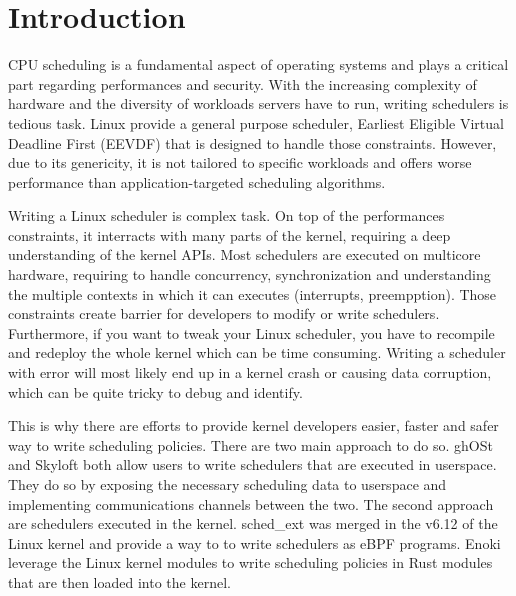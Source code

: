\section{Introduction}

\par CPU scheduling is a fundamental aspect of operating systems and plays a critical part regarding performances and security. With the increasing complexity of hardware and the diversity of workloads servers have to run, writing schedulers is tedious task\cite{hybridsched}. Linux provide a general purpose scheduler, Earliest Eligible Virtual Deadline First (EEVDF)\cite{eevdf} that is designed to handle those constraints. However, due to its genericity, it is not tailored to specific workloads and offers worse performance than application-targeted scheduling algorithms\cite{ghost,shenango}. \newline

\par Writing a Linux scheduler is complex task. On top of the performances constraints, it interracts with many parts of the kernel, requiring a deep understanding of the kernel APIs. Most schedulers are executed on multicore hardware, requiring to handle concurrency, synchronization and understanding the multiple contexts in which it can executes (interrupts, preempption). Those constraints create barrier for developers to modify or write schedulers. Furthermore, if you want to tweak your Linux scheduler, you have to recompile and redeploy the whole kernel which can be time consuming. Writing a scheduler with error will most likely end up in a kernel crash or causing data corruption, which can be quite tricky to debug and identify. \newline

\par This is why there are efforts to provide kernel developers easier, faster and safer way to write scheduling policies. There are two main approach to do so. ghOSt\cite{ghost} and Skyloft\cite{skyloft} both allow users to write schedulers that are executed in userspace. They do so by exposing the necessary scheduling data to userspace and implementing communications channels between the two. The second approach are schedulers executed in the kernel. sched\_ext\cite{schedext} was merged in the v6.12 of the Linux kernel and provide a way to to write schedulers as eBPF\cite{ebpf} programs. Enoki\cite{enoki} leverage the Linux kernel modules to write scheduling policies in Rust modules that are then loaded into the kernel.\newline

